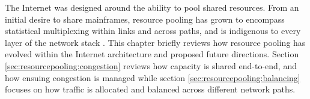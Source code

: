 The Internet was designed around the ability to pool shared resources. 
From an initial desire to share mainframes, resource pooling has grown to encompass statistical multiplexing within links and across paths, and is indigenous to every layer of the network stack \cite{Wischik:2008p137}. 
This chapter briefly reviews how resource pooling has evolved within the Internet architecture and proposed future directions. 
Section \ref{sec:resourcepooling:congestion} reviews how capacity is shared end-to-end, and how ensuing congestion is managed while section \ref{sec:resourcepooling:balancing} focuses on how traffic is allocated and balanced across different network paths.
